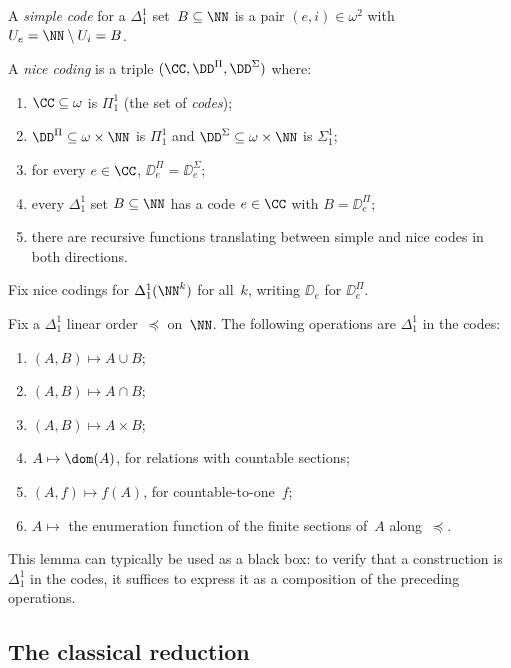 \begin{definition}\label{def:simple-nice-codes}
	A \emph{simple code} for a $\Delta^1_1$ set~$B\subseteq\NN$ is a pair $(e,i)\in\omega^2$ with $U_e = \NN\setminus U_i = B$.

	A \emph{nice coding} is a triple $(\CC,\DD^\Pi,\DD^\Sigma)$ where:
	\begin{enumerate}[label=(\roman*)]
		\item $\CC\subseteq\omega$ is $\Pi^1_1$ (the set of \emph{codes});
		\item $\DD^\Pi\subseteq\omega\times\NN$ is $\Pi^1_1$ and $\DD^\Sigma\subseteq\omega\times\NN$ is $\Sigma^1_1$;
		\item for every $e\in\CC$, $\DD^\Pi_e = \DD^\Sigma_e$;
		\item every $\Delta^1_1$ set $B\subseteq\NN$ has a code $e\in\CC$ with $B = \DD^\Pi_e$;
		\item there are recursive functions translating between simple and nice codes in both directions.
	\end{enumerate}
\end{definition}

Fix nice codings for $\Delta^1_1(\NN^k)$ for all~$k$, writing $\DD_e$ for $\DD^\Pi_e$.

\begin{lemma}\label{lemma:toolkit}
	Fix a $\Delta^1_1$ linear order~$\preceq$ on~$\NN$.
	The following operations are $\Delta^1_1$ in the codes:
	\begin{enumerate}[label=(\arabic*)]
		\item $(A,B)\mapsto A\cup B$;
		\item $(A,B)\mapsto A\cap B$;
		\item $(A,B)\mapsto A\times B$;
		\item $A\mapsto\dom(A)$, for relations with countable sections;
		\item $(A,f)\mapsto f(A)$, for countable-to-one~$f$;
		\item $A\mapsto$ the enumeration function of the finite sections of~$A$ along~$\preceq$.
	\end{enumerate}
\end{lemma}

This lemma can typically be used as a black box: to verify that a construction is $\Delta^1_1$ in the codes, it suffices to express it as a composition of the preceding operations.

\subsection{The classical reduction}\label{sec:classical}

